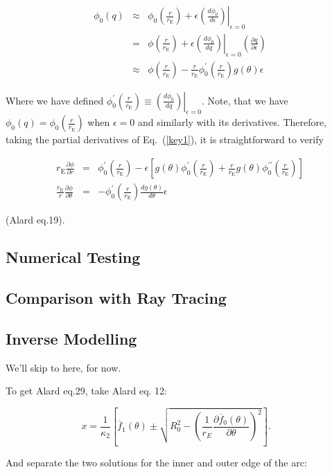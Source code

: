\documentclass{article}
\def\be{\begin{equation}}
\def\ee{\end{equation}}
\newcommand{\eps}{\epsilon}
\def \eps {\epsilon}
\def \te {\theta}
\def \rre {\frac{r}{r_{\mathrm{E}}}}
\def \pa {\partial}
\def \prre {\left( \rre\right)}
\def \te {\theta}
\def \pa {\partial}
\begin{document}
\def\dpdq{ \left. \left( \frac{d\phi_0}{dq}\right) \right|_{\eps=0} }
\def\dpde{ \left. \left( \frac{d\phi_0}{d\eps}\right) \right|_{\eps=0} }

\begin{eqnarray}
 \phi_0(q) &\approx& \phi_0\prre+\eps \dpde \\
	  & = & \phi\prre+\eps \dpdq  \left(\frac{\pa q}{\pa \eps}\right)\\
	  &\approx& \phi\prre-\rre\phi_0^\prime\prre g(\te)\eps \label{key1}
\end{eqnarray}

Where we have defined $\phi_0^\prime\prre \equiv  \dpdq$.  Note, that we have $\phi_0(q)=\phi_0\prre$ when $\eps=0$ and similarly with its derivatives. Therefore,
taking the partial derivatives of Eq.~(\ref{key1}), it is straightforward to verify

\begin{eqnarray}
 r_{\mathrm{E}}\frac{\pa \phi}{\pa r}&=& \phi_0^\prime\prre -%
  \eps\left[g(\te)\phi_0^\prime\prre+\rre g(\te)\phi_0^{\prime \prime}\prre\right]\\
\frac{r_{\mathrm{E}}}{r}\frac{\pa \phi}{\pa \te}&=&-\phi_0^\prime\prre \frac{dg(\te)}{d\te}\eps
\end{eqnarray}

(Alard eq.19).

\subsection{Numerical Testing}

\subsection{Comparison with Ray Tracing}

\subsection{Inverse Modelling}

We'll skip to here, for now.

To get Alard eq.29, take Alard eq. 12:


\be
x = \frac{1}{\kappa_2}\left[ \overline{f}_{1}(\theta) \pm \sqrt{R_0^2 - \left( \frac{1}{r_E}\frac{\partial \overline{f}_0(\theta)}{\partial \theta} \right)^2} \right]. \;\;\; 
\ee

And separate the two solutions for the inner and outer edge of the arc:
\end{document}
